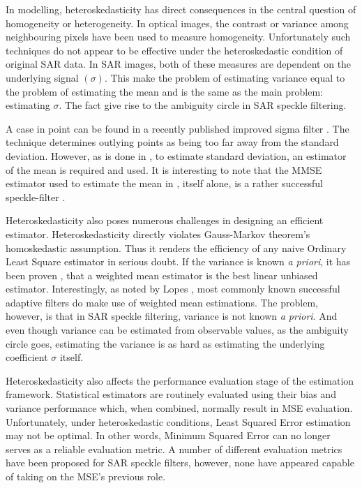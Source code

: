 In modelling, heteroskedasticity has direct consequences in the central question of homogeneity or heterogeneity. 
In optical images, the contrast or variance among neighbouring pixels have been used to measure homogeneity. 
Unfortunately such techniques do not appear to be effective under the heteroskedastic condition of original SAR data. 
In SAR images, both of these measures are dependent on the underlying signal $(\sigma)$. 
This make the problem of estimating variance equal to the problem of estimating the mean and is the same as the main problem: estimating $\sigma$. 
The fact give rise to the ambiguity circle in SAR speckle filtering.

A case in point can be found in a recently published improved sigma filter \cite{Lee_TGRS_2009}. 
The technique determines outlying points as being too far away from the standard deviation. 
However, as is done in \cite{Lee_TGRS_2009}, to estimate standard deviation, an estimator of the mean is required and used. 
It is interesting to note that the MMSE estimator used to estimate the mean in \cite{Lee_TGRS_2009}, itself alone, is a rather successful speckle-filter \cite{Lee_PAMI_1980}.

Heteroskedasticity also poses numerous challenges in designing an efficient estimator. Heteroskedasticity directly violates Gauss-Markov theorem's homoskedastic assumption. 
Thus it renders the efficiency of any naive Ordinary Least Square estimator in serious doubt. 
If the variance is known \textit{a priori}, it has been proven \cite{Aitken_1934_ProcsRoyalSocEdinburg}, that a weighted mean estimator is the best linear unbiased estimator. 
Interestingly, as noted by Lopes \cite{Lopes_TGRS_1990}, most commonly known successful adaptive filters \cite{Lee_PAMI_1980, Kuan_1985_PAMI, Frost_PAMI_1982} do make use of weighted mean estimations. 
The problem, however, is that in SAR speckle filtering, variance is not known \textit{a priori}. 
And even though variance can be estimated from observable values, as the ambiguity circle goes, estimating the variance is as hard as estimating the underlying coefficient $\sigma$ itself.

Heteroskedasticity also affects the performance evaluation stage of the estimation framework.
Statistical estimators are routinely evaluated using their bias and variance performance
  which, when combined, normally result in MSE evaluation.
Unfortunately, under heteroskedastic conditions, Least Squared Error estimation may not be optimal.   
In other words, Minimum Squared Error can no longer serves as a reliable evaluation metric.
A number of different evaluation metrics have been proposed for SAR speckle filters,
  however, none have appeared capable of taking on the MSE's previous role.

